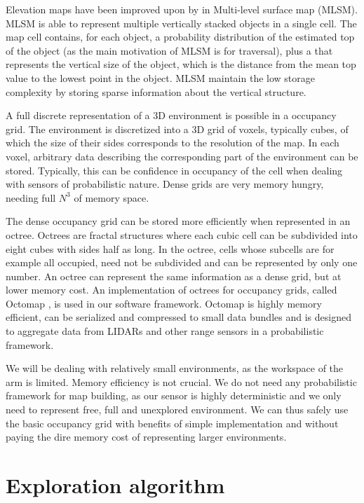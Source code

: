 \documentclass[buriama8_dp.tex]{subfiles}
\begin{document}
Elevation maps have been improved upon by \cite{multilevel} in Multi-level surface map (MLSM). MLSM is able to represent multiple vertically stacked objects in a single cell. The map cell contains, for each object, a probability distribution of the estimated top of the object (as the main motivation of MLSM is for traversal), plus a  that represents the vertical size of the object, which is the distance from the mean top value to the lowest point in the object. MLSM maintain the low storage complexity by storing sparse information about the vertical structure.

A full discrete representation of a 3D environment is possible in a occupancy grid. The environment is discretized into a 3D grid of voxels, typically cubes, of which the size of their sides corresponds to the resolution of the map. In each voxel, arbitrary data describing the corresponding part of the environment can be stored. Typically, this can be confidence in occupancy of the cell when dealing with sensors of probabilistic nature. Dense grids are very memory hungry, needing full \(N^3\) of memory space.

The dense occupancy grid can be stored more efficiently when represented in an octree. Octrees are fractal structures where each cubic cell can be subdivided into eight cubes with sides half as long. In the octree, cells whose subcells are for example all occupied, need not be subdivided and can be represented by only one number. An octree can represent the same information as a dense grid, but at lower memory cost. An implementation of octrees for occupancy grids, called Octomap \cite{octomap}, is used in our software framework. Octomap is highly memory efficient, can be serialized and compressed to small data bundles and is designed to aggregate data from LIDARs and other range sensors in a probabilistic framework.

We will be dealing with relatively small environments, as the workspace of the arm is limited. Memory efficiency is not crucial. We do not need any probabilistic framework for map building, as our sensor is highly deterministic and we only need to represent free, full and unexplored environment. We can thus safely use the basic occupancy grid with benefits of simple implementation and without paying the dire memory cost of representing larger environments.

\section{Exploration algorithm}
\end{document}
